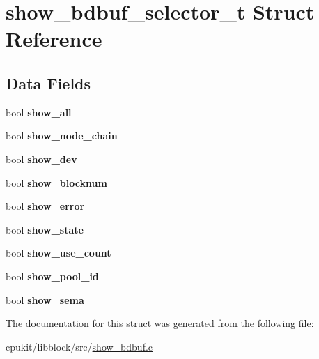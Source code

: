 \hypertarget{structshow__bdbuf__selector__t}{}\section{show\+\_\+bdbuf\+\_\+selector\+\_\+t Struct Reference}
\label{structshow__bdbuf__selector__t}
\subsection*{Data Fields}
\begin{DoxyCompactItemize}
\item 
\mbox{\label{structshow__bdbuf__selector__t_ac02bf0826102b7414076b9b455978eaf}} 
bool {\bfseries show\+\_\+all}
\item 
\mbox{\label{structshow__bdbuf__selector__t_a6b8b74e2f052342a2611b7a12d4543c7}} 
bool {\bfseries show\+\_\+node\+\_\+chain}
\item 
\mbox{\label{structshow__bdbuf__selector__t_a780a503dfbe0b38891044ea2dfa09d7b}} 
bool {\bfseries show\+\_\+dev}
\item 
\mbox{\label{structshow__bdbuf__selector__t_a7b5941c0e431df737a4498bc4369b9f2}} 
bool {\bfseries show\+\_\+blocknum}
\item 
\mbox{\label{structshow__bdbuf__selector__t_a16189f964ae050078acb29087a8c8e98}} 
bool {\bfseries show\+\_\+error}
\item 
\mbox{\label{structshow__bdbuf__selector__t_adc67deedf891c5ac2be7e18c211d6138}} 
bool {\bfseries show\+\_\+state}
\item 
\mbox{\label{structshow__bdbuf__selector__t_aa9245d5d699ccf9be5a4842f745a8102}} 
bool {\bfseries show\+\_\+use\+\_\+count}
\item 
\mbox{\label{structshow__bdbuf__selector__t_a50aed601fd3594f38bd40212f478fba5}} 
bool {\bfseries show\+\_\+pool\+\_\+id}
\item 
\mbox{\label{structshow__bdbuf__selector__t_a581cb184eddf6c09ed9ff08e9232e50c}} 
bool {\bfseries show\+\_\+sema}
\end{DoxyCompactItemize}


The documentation for this struct was generated from the following file\+:\begin{DoxyCompactItemize}
\item 
cpukit/libblock/src/\mbox{\hyperlink{show__bdbuf_8c}{show\+\_\+bdbuf.\+c}}\end{DoxyCompactItemize}
